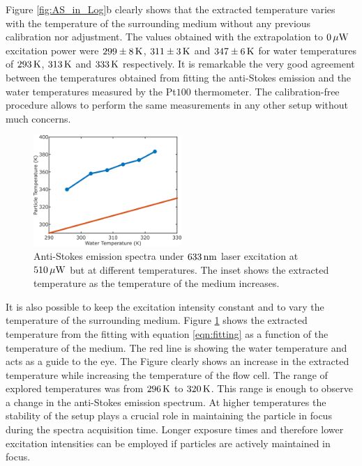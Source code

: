 Figure \ref{fig:AS_in_Log}b clearly shows that the extracted temperature varies
with the temperature of the surrounding medium without any previous calibration
nor adjustment. The values obtained with the extrapolation to $0\,\mu\textrm{W}$ excitation
power were $299 \pm 8\,\textrm{K}$, $311\pm 3\,\textrm{K}$ and $347 \pm 6\,\textrm{K}$ for water temperatures
of $293\,\textrm{K}$, $313\,\textrm{K}$ and $333\,\textrm{K}$ respectively. It is remarkable the very good
agreement between the temperatures obtained from fitting the anti-Stokes
emission and the water temperatures measured by the Pt$100$ thermometer. The
calibration-free procedure allows to perform the same measurements in any other
setup without much concerns.

\begin{figure}[htp] \centering
\includegraphics[width=0.50\textwidth]{Chapters/04_Anti-Stokes/Figures/04_Extracted_Temp/04_extracted_temp.png}
\caption{Anti-Stokes emission spectra under $633\,\textrm{nm}$ laser excitation at
$510\,\mu\textrm{W}$ but at different temperatures. The inset shows the extracted
temperature as the temperature of the medium increases.}
	\label{fig:AS-temps-rods}
\end{figure}

It is also possible to keep the excitation intensity constant and to vary the
temperature of the surrounding medium. Figure \ref{fig:AS-temps-rods} shows the
extracted temperature from the fitting with equation \ref{eqn:fitting} as a
function of the temperature of the medium. The red line is showing the water
temperature and acts as a guide to the eye. The Figure clearly shows an increase in the extracted temperature while
increasing the temperature of the flow cell. The range of explored
temperatures was from $296\,\textrm{K}$ to $320\,\textrm{K}$. This range is
enough to observe a change in the anti-Stokes emission spectrum. At higher
temperatures the stability of the setup plays a crucial role in maintaining the
particle in focus during the spectra acquisition time. Longer exposure times and
therefore lower excitation intensities can be employed if particles are actively
maintained in focus.

